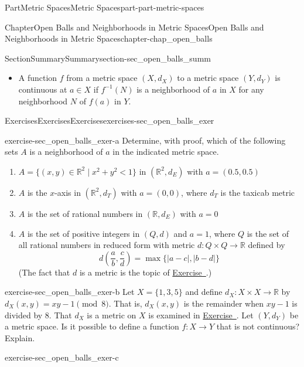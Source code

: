 \documentclass[oneside,10pt,]{book}
\newcommand{\xreffont}{\relax}
\numberwithin{equation}{chapter}
\newcommand{\R}{\mathbb{R}}
\newcommand{\lt}{<}
\begin{document}
\begin{partptx}{Part}{Metric Spaces}{}{Metric Spaces}{}{}{part-part-metric-spaces}
\begin{chapterptx}{Chapter}{Open Balls and Neighborhoods in Metric Spaces}{}{Open Balls and Neighborhoods in Metric Spaces}{}{}{chapter-chap_open_balls}
\begin{sectionptx}{Section}{Summary}{}{Summary}{}{}{section-sec_open_balls_summ}
\begin{itemize}[label=\textbullet]
\item{}A function \(f\) from a metric space \((X,d_X)\) to a metric space \((Y,d_Y)\) is continuous at \(a \in X\) if \(f^{-1}(N)\) is a neighborhood of \(a\) in \(X\) for any neighborhood \(N\) of \(f(a)\) in \(Y\).%
\end{itemize}
%
\end{sectionptx}
%
%
\typeout{************************************************}
\typeout{************************************************}
%
\begin{exercises-section}{Exercises}{Exercises}{}{Exercises}{}{}{exercises-sec_open_balls_exer}
\begin{divisionexercise}{1}{}{}{exercise-sec_open_balls_exer-a}%
Determine, with proof, which of the following sets \(A\) is a neighborhood of \(a\) in the indicated metric space.%
\begin{enumerate}[font=\bfseries,label=(\alph*),ref=\alph*]%
\item{}\(A = \{(x,y) \in \R^2 \mid x^2+y^2 \lt 1\}\) in \((\R^2,d_E)\) with \(a = (0.5,0.5)\)%
\item{}\(A\) is the \(x\)-axis in \((\R^2,d_T)\) with \(a =(0,0)\), where \(d_T\) is the taxicab metric%
\item{}\(A\) is the set of rational numbers in \((\R, d_E)\) with \(a = 0\)%
\item{}\(A\) is the set of positive integers in \((Q,d)\) and \(a = 1\), where \(Q\) is the set of all rational numbers in reduced form with metric \(d : Q \times Q \to \R\) defined by%
\begin{equation*}
d\left(\frac{a}{b}, \frac{c}{d}\right) = \max\{| a-c |, | b-d |\}
\end{equation*}
(The fact that \(d\) is a metric is the topic of \hyperlink{exercise-ex_MS_Q_metric}{Exercise~{\xreffont 3}}.)%
\end{enumerate}%
\end{divisionexercise}%
\begin{divisionexercise}{2}{}{}{exercise-sec_open_balls_exer-b}%
Let \(X = \{1,3,5\}\) and define \(d_X: X \times X \to \R\) by \(d_X(x,y) = xy - 1 \pmod{8}\). That is, \(d_X(x,y)\) is the remainder when \(xy - 1\) is divided by \(8\). That \(d_X\) is a metric on \(X\) is examined in \hyperlink{exercise-ex_MS_mod_metric}{Exercise~{\xreffont 2}}. Let \((Y,d_Y)\) be a metric space. Is it possible to define a function \(f: X \to Y\) that is not continuous? Explain.%
\end{divisionexercise}%
\begin{divisionexercise}{3}{}{}{exercise-sec_open_balls_exer-c}%

\end{divisionexercise}
\end{exercises-section}
\end{chapterptx}
\end{partptx}
\end{document}
